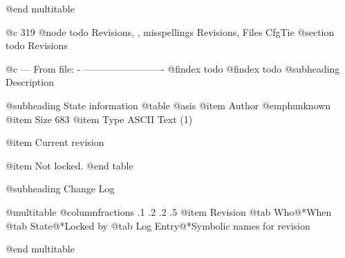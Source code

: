 @end multitable


@c 319
@node todo Revisions,  , misspellings Revisions, Files CfgTie
@section todo Revisions


@c --- From file: - -------------------------
@findex todo
@findex todo
@subheading Description


@subheading State information
@table @asis
@item Author
@emph{unknown}
@item Size
683
@item Type
ASCII Text (1)

@item Current revision

@item Not locked.
@end table

@subheading Change Log

@multitable @columnfractions .1 .2 .2 .5
@item Revision
@tab Who@*When
@tab State@*Locked by
@tab Log Entry@*Symbolic names for revision


@end multitable



